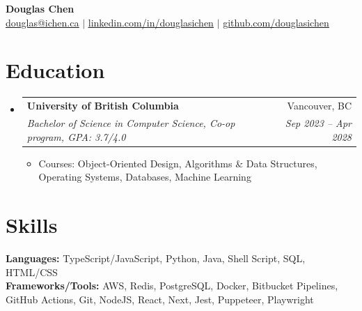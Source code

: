 \documentclass[letterpaper,11pt]{article}
\makeatletter
\newcommand{\resumeItem}[1]{
  \item\small{
    {#1 \vspace{-0.6pt}}
  }
}
\newcommand{\resumeSubheading}[4]{
  \vspace{0pt}\item
    \begin{tabular*}{0.97\textwidth}[t]{l@{\extracolsep{\fill}}r}
      \textbf{#1} & #2 \\
      \textit{\small#3} & \textit{\small #4} \\
    \end{tabular*}\vspace{-7pt}
}
\newcommand{\resumeSubHeadingListStart}{\begin{itemize}[leftmargin=0.15in, label={}]}
\newcommand{\resumeSubHeadingListEnd}{\end{itemize}}
\newcommand{\resumeItemListStart}{\begin{itemize}}
\newcommand{\resumeItemListEnd}{\end{itemize}\vspace{-7pt}}
\makeatother
\begin{document}
\begin{center}
    \textbf{\Huge Douglas Chen} \\ \vspace{1pt}
    \href{mailto:douglas@ichen.ca}{\underline{douglas@ichen.ca}} $|$
    \href{https://www.linkedin.com/in/douglasichen/}{\underline{linkedin.com/in/douglasichen}} $|$
    \href{https://www.github.com/douglasichen}{\underline{github.com/douglasichen}}
\end{center}

\section{Education}
  \resumeSubHeadingListStart
    \resumeSubheading
      {University of British Columbia}{Vancouver, BC}
      {Bachelor of Science in Computer Science, Co-op program, GPA: 3.7/4.0}{Sep 2023 -- Apr 2028}
      \resumeItemListStart
        \resumeItem{Courses: Object-Oriented Design, Algorithms \& Data Structures, Operating Systems, Databases, Machine Learning}
      \resumeItemListEnd
  \resumeSubHeadingListEnd

\section{Skills}
 \begin{itemize}[leftmargin=0.15in, label={}]
    \small{\item{
         \textbf{Languages:}{ TypeScript/JavaScript, Python, Java, Shell Script, SQL, HTML/CSS} \\
     \textbf{Frameworks/Tools:}{ AWS, Redis, PostgreSQL, Docker, Bitbucket Pipelines, GitHub Actions, Git, NodeJS, React, Next, Jest, Puppeteer, Playwright}
    }}
 \end{itemize}
\end{document}
